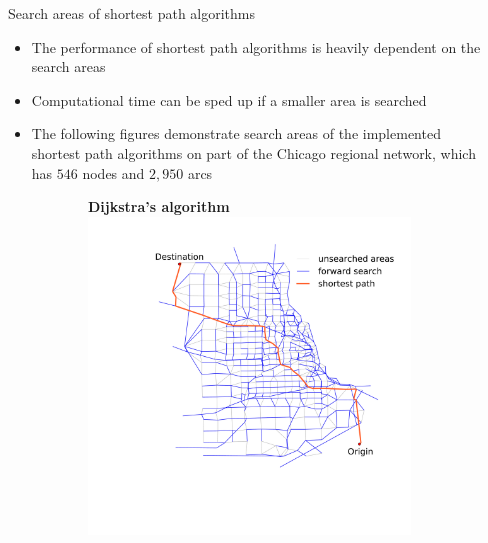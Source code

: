 \documentclass[final]{beamer}
\begin{document}
\begin{frame}{ }
\begin{columns}[t]
\begin{column}{.26\linewidth}
    \end{column}
    \begin{column}{.4\linewidth}
        \begin{block}{Search areas of shortest path algorithms \vspace{-.2em}}
            \begin{itemize}
                \itemsep.4em
                \item The performance of shortest path algorithms is heavily dependent on the search areas
                \item Computational time can be sped up if a smaller area is searched 
                \item The following figures demonstrate search areas of the implemented shortest path algorithms on part of the Chicago regional network, which has $546$ nodes and $2{,}950$ arcs
            \end{itemize}
            \vspace{1em}
            \begin{figure}
                \centering
                \begin{subfigure}{.5\linewidth}
                    \centering
                    {\bfseries Dijkstra's algorithm }
                    \includegraphics[width=\linewidth,trim=120px 280px 48px 60px,clip]{img/dijkstra}
                    \begin{itemize}

\end{itemize}
\end{subfigure}
\end{figure}
\end{block}
\end{column}
\end{columns}
\end{frame}
\end{document}
